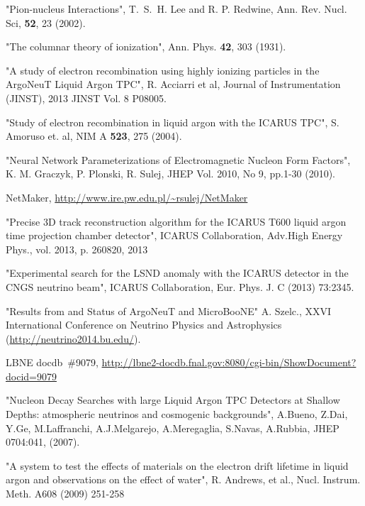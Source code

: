 \begin{thebibliography}{99}
 "Pion-nucleus Interactions", T.~S.~H. Lee and R. P. Redwine, Ann. Rev. Nucl. Sci,  {\bf 52}, 23 (2002).

 "The columnar theory of ionization", Ann. Phys. {\bf 42}, 303 (1931).

 "A study of electron recombination using highly ionizing particles in the ArgoNeuT Liquid Argon TPC", 
R. Acciarri et al, Journal of Instrumentation 
(JINST), 2013 JINST Vol. 8 P08005.

 "Study of electron recombination in liquid argon with the ICARUS TPC", S. Amoruso et. al, NIM A {\bf 523}, 275 (2004). 

 "Neural Network Parameterizations of Electromagnetic Nucleon Form Factors", K. M. Graczyk, P. Plonski, R. Sulej, JHEP Vol. 2010, No 9, pp.1-30 (2010).

 NetMaker, \url{http://www.ire.pw.edu.pl/~rsulej/NetMaker}

"Precise 3D track reconstruction algorithm for the ICARUS T600 liquid argon time projection chamber detector", ICARUS Collaboration, 
Adv.High Energy Phys., vol. 2013, p. 260820, 2013

 "Experimental search for the LSND anomaly with the ICARUS
detector in the CNGS neutrino beam", ICARUS Collaboration, Eur. Phys. J. C (2013) 73:2345.

 "Results from and Status of ArgoNeuT and MicroBooNE" A. Szelc., XXVI International Conference on Neutrino Physics and Astrophysics (\url{http://neutrino2014.bu.edu/}).

 LBNE docdb~\#9079, \url{http://lbne2-docdb.fnal.gov:8080/cgi-bin/ShowDocument?docid=9079}

 "Nucleon Decay Searches with large Liquid Argon TPC Detectors at Shallow Depths: atmospheric neutrinos and cosmogenic backgrounds", A.Bueno, Z.Dai, Y.Ge, M.Laffranchi, A.J.Melgarejo, A.Meregaglia, S.Navas, A.Rubbia, JHEP 0704:041, (2007).

%
%
 "A system to test the effects of materials on the electron drift lifetime in liquid argon and observations on the effect of water", R. Andrews, et al., Nucl. Instrum. Meth. A608 (2009) 251-258


\end{thebibliography}
